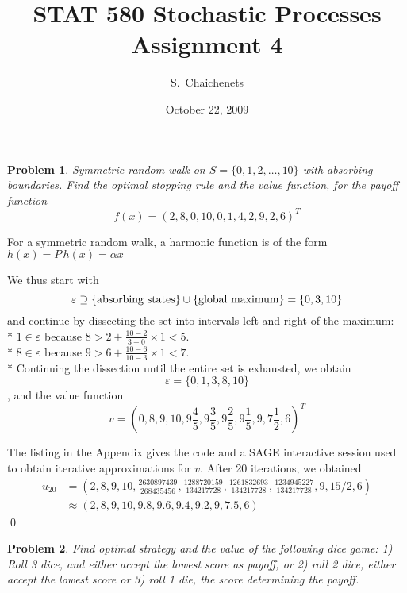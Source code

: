 \documentclass[aps,prl,twocolumn,floatfix,letterpaper]{revtex4}
\newtheorem{problem}{Problem}
\newenvironment{solution}[1][Solution]{\begin{trivlist}
    \item[\hskip \labelsep {\bfseries #1}]}{\end{trivlist}}
\begin{document}
\title{STAT 580 Stochastic Processes \\
	Assignment 4}
\author{ S.\ Chaichenets }
\date{October 22, 2009}
\maketitle



\begin{problem}
Symmetric random walk on $S=\{0,1,2,\ldots,10\}$ with absorbing boundaries.
Find the optimal stopping rule and the value function, for the payoff function
$$
	f(x) = (2,8,0,10,0,1,4,2,9,2,6)^T
$$
\end{problem}

\begin{solution}
For a symmetric random walk, a harmonic function is of the
form $h(x) = P\,h(x) = \alpha x$ %

We thus start with $$\varepsilon \supseteq \{ {\rm absorbing\ states} \} \cup \{ {\rm global\ maximum}\} = \{0,3,10\}$$
and continue by dissecting the set into intervals left and right of the maximum: \\*
${1} \in \varepsilon $ because $ 8 > 2 + \frac{10-2}{3-0}\times1 < 5$.\\*
${8} \in \varepsilon $ because $ 9 > 6 + \frac{10-6}{10-3}\times1 < 7$. \\*
Continuing the dissection until the entire set is exhausted, we obtain
$$\varepsilon=\{0,1,3,8,10\}$$, and the value function
$$
v = (0,8,9,10,9\frac{4}{5},9\frac{3}{5},9\frac{2}{5},9\frac{1}{5},9,7\frac{1}{2},6)^T
$$

The listing in the Appendix gives the code and a {\rm SAGE} interactive session used to obtain 
iterative approximations for $v$. After 20 iterations, we obtained
\tiny
\begin{equation}
\begin{split}
u_{20} &= 
(2, 8, 9, 10, \frac{2630897439}{268435456}, \frac{1288720159}{134217728},
\frac{1261832693}{134217728}, \frac{1234945227}{134217728}, 9, 15/2, 6) \\
&\approx 
(2, 8, 9, 10, 9.8, 9.6, 9.4, 9.2, 9, 7.5, 6)
\end{split}
\end{equation}
\normalsize
\qed
\end{solution}

\begin{problem}
Find optimal strategy and the value of the following dice game:
1) Roll 3 dice, and either accept the lowest score as payoff, or
2) roll 2 dice, either accept the lowest score or
3) roll 1 die, the score determining the payoff.
\end{problem}
\end{document}
